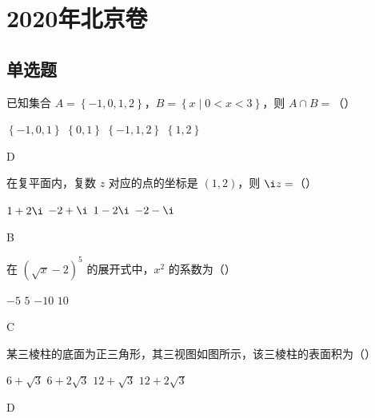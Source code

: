 \chapter{2020年北京卷}

\section{单选题}

\begin{problem}
已知集合 \(A=\left\{ -1,0,1,2 \right\}\)，\(B=\left\{ x\mid 0<x<3 \right\}\)，则 \(A\cap B=\)（\quad）

\choices
    {\(\left\{ -1,0,1 \right\}\)}
    {\(\left\{ 0,1 \right\}\)}
    {\(\left\{ -1,1,2 \right\}\)}
    {\(\left\{ 1,2 \right\}\)}
\end{problem}

\begin{answer}
D
\end{answer}

\begin{problem}
在复平面内，复数 \(z\) 对应的点的坐标是 \((1,2)\)，则 \(\i z=\)（\quad）

\choices
    {\(1+2\i\)}
    {\(-2+\i\)}
    {\(1-2\i\)}
    {\(-2-\i\)}
\end{problem}

\begin{answer}
B
\end{answer}

\begin{problem}
在 \(\left(\sqrt{x}-2\right)^5\) 的展开式中，\(x^2\) 的系数为（\quad）

\choices
    {\(-5\)}
    {\(5\)}
    {\(-10\)}
    {\(10\)}
\end{problem}

\begin{answer}
C
\end{answer}

\begin{problem}
某三棱柱的底面为正三角形，其三视图如图所示，该三棱柱的表面积为（\quad）

\begin{center}
\end{center}

\choices
    {\(6+\sqrt3\)}
    {\(6+2\sqrt3\)}
    {\(12+\sqrt3\)}
    {\(12+2\sqrt3\)}
\end{problem}

\begin{answer}
D
\end{answer}


